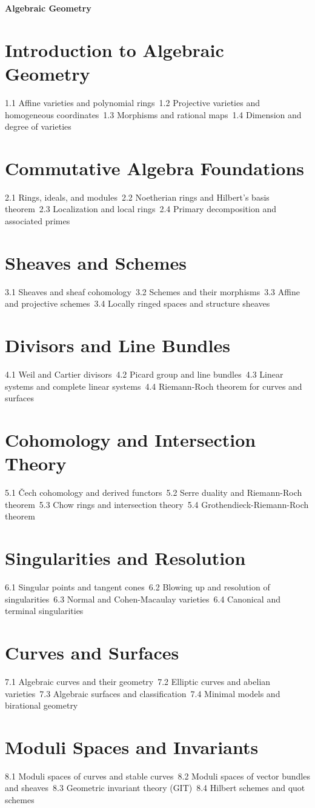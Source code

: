 {\LARGE \bf{Algebraic Geometry}}
\section{Introduction to Algebraic Geometry}
1.1 Affine varieties and polynomial rings\
1.2 Projective varieties and homogeneous coordinates\
1.3 Morphisms and rational maps\
1.4 Dimension and degree of varieties\
\section{Commutative Algebra Foundations}
2.1 Rings, ideals, and modules\
2.2 Noetherian rings and Hilbert's basis theorem\
2.3 Localization and local rings\
2.4 Primary decomposition and associated primes\
\section{Sheaves and Schemes}
3.1 Sheaves and sheaf cohomology\
3.2 Schemes and their morphisms\
3.3 Affine and projective schemes\
3.4 Locally ringed spaces and structure sheaves\
\section{Divisors and Line Bundles}
4.1 Weil and Cartier divisors\
4.2 Picard group and line bundles\
4.3 Linear systems and complete linear systems\
4.4 Riemann-Roch theorem for curves and surfaces\
\section{Cohomology and Intersection Theory}
5.1 Čech cohomology and derived functors\
5.2 Serre duality and Riemann-Roch theorem\
5.3 Chow rings and intersection theory\
5.4 Grothendieck-Riemann-Roch theorem\
\section{Singularities and Resolution}
6.1 Singular points and tangent cones\
6.2 Blowing up and resolution of singularities\
6.3 Normal and Cohen-Macaulay varieties\
6.4 Canonical and terminal singularities\
\section{Curves and Surfaces}
7.1 Algebraic curves and their geometry\
7.2 Elliptic curves and abelian varieties\
7.3 Algebraic surfaces and classification\
7.4 Minimal models and birational geometry\
\section{Moduli Spaces and Invariants}
8.1 Moduli spaces of curves and stable curves\
8.2 Moduli spaces of vector bundles and sheaves\
8.3 Geometric invariant theory (GIT)\
8.4 Hilbert schemes and quot schemes\
